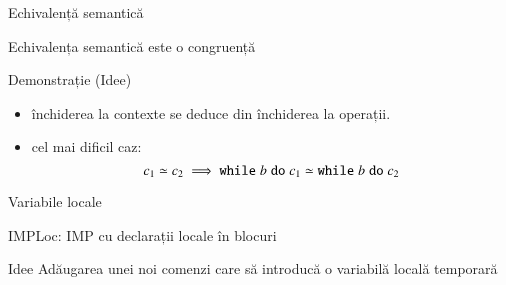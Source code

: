 \begin{section}{Echivalență semantică}
\begin{frame}{Echivalența semantică este o congruență}
\begin{block}{Demonstrație (Idee)}
\begin{itemize}
\item închiderea la contexte se deduce din închiderea la operații.
\item cel mai dificil caz: 
\[c_1\simeq c_2 \implies {{\ensuremath\mathrel{\text{\ttfamily while}}b \ensuremath\mathrel{\text{\ttfamily do}}c_1} \simeq {\ensuremath\mathrel{\text{\ttfamily while}}b \ensuremath\mathrel{\text{\ttfamily do}}c_2}}\]
\end{itemize}
\end{block}
\end{frame}
\end{section}

\begin{section}{Variabile locale}
\begin{frame}{IMPLoc: IMP cu declarații locale în blocuri}
\begin{block}{Idee}
Adăugarea unei noi comenzi care să introducă o variabilă locală temporară
\end{block}


\end{frame}
\end{section}
